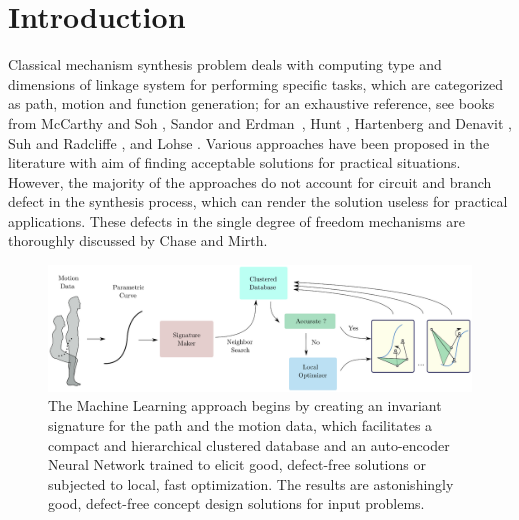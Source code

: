 \documentclass[twocolumn,10pt]{asme2ej}
\begin{document}
\section{Introduction}
Classical mechanism synthesis problem deals with computing type and dimensions of linkage system for performing specific tasks, which are categorized as path, motion and function generation; for an exhaustive reference, see books from McCarthy and Soh \cite{sohmccarthy}, Sandor and Erdman~\cite{Sandor}, Hunt \cite{Hunt78}, Hartenberg and Denavit \cite{Hartenberg},  Suh and Radcliffe \cite{Suh78}, and Lohse \cite{lohse2013}.
Various approaches have been proposed in the literature with aim of finding acceptable solutions for practical situations.
However, the majority of the approaches do not account for circuit and branch defect in the synthesis process, which can render the solution useless for practical applications.
These defects in the single degree of freedom mechanisms are thoroughly discussed by Chase and Mirth\cite{chasemirth}.

\begin{figure}
\centering
\includegraphics[width=\textwidth]{figure/overall_approach.eps}
  \caption{The Machine Learning approach begins by creating an invariant signature for the path and the motion data, which facilitates a compact and hierarchical clustered database and an auto-encoder Neural Network trained to elicit good, defect-free solutions or subjected to local, fast optimization. The results are astonishingly good, defect-free concept design solutions for input problems.}
\label{overallMethod}
\end{figure}
\end{document}
